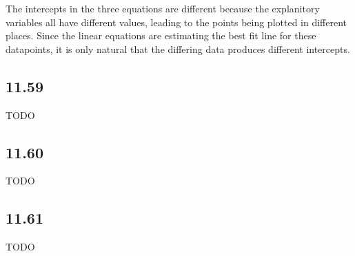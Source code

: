 \documentclass[]{article}
\begin{document}
The intercepts in the three equations are different because the
explanitory variables all have different values, leading to the points
being plotted in different places. Since the linear equations are
estimating the best fit line for these datapoints, it is only natural
that the differing data produces different intercepts.

\hypertarget{section-6}{%
\subsection{11.59}\label{section-6}}

TODO

\hypertarget{section-7}{%
\subsection{11.60}\label{section-7}}

TODO

\hypertarget{section-8}{%
\subsection{11.61}\label{section-8}}

TODO
\end{document}
